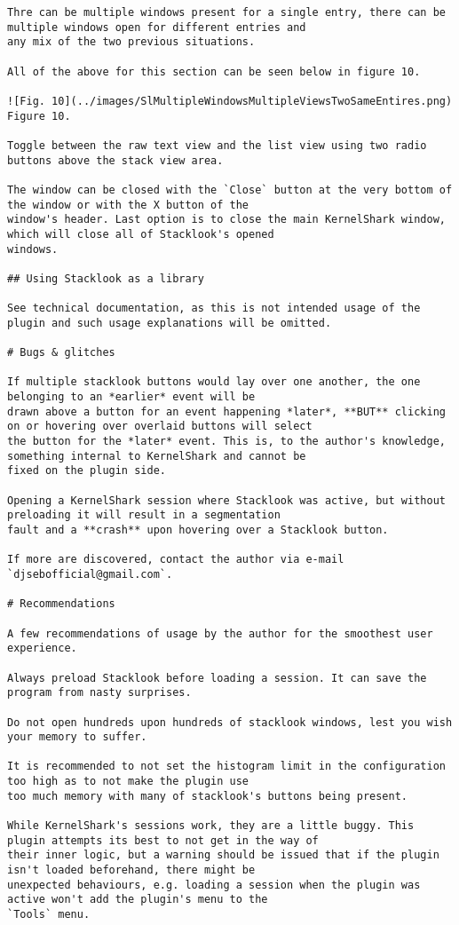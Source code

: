 \begin{verbatim}
Thre can be multiple windows present for a single entry, there can be multiple windows open for different entries and
any mix of the two previous situations.

All of the above for this section can be seen below in figure 10.

![Fig. 10](../images/SlMultipleWindowsMultipleViewsTwoSameEntires.png)
Figure 10.

Toggle between the raw text view and the list view using two radio buttons above the stack view area.

The window can be closed with the `Close` button at the very bottom of the window or with the X button of the 
window's header. Last option is to close the main KernelShark window, which will close all of Stacklook's opened 
windows.

## Using Stacklook as a library

See technical documentation, as this is not intended usage of the plugin and such usage explanations will be omitted.

# Bugs & glitches

If multiple stacklook buttons would lay over one another, the one belonging to an *earlier* event will be 
drawn above a button for an event happening *later*, **BUT** clicking on or hovering over overlaid buttons will select 
the button for the *later* event. This is, to the author's knowledge, something internal to KernelShark and cannot be
fixed on the plugin side.

Opening a KernelShark session where Stacklook was active, but without preloading it will result in a segmentation
fault and a **crash** upon hovering over a Stacklook button.

If more are discovered, contact the author via e-mail `djsebofficial@gmail.com`.

# Recommendations

A few recommendations of usage by the author for the smoothest user experience.

Always preload Stacklook before loading a session. It can save the program from nasty surprises.

Do not open hundreds upon hundreds of stacklook windows, lest you wish your memory to suffer.

It is recommended to not set the histogram limit in the configuration too high as to not make the plugin use
too much memory with many of stacklook's buttons being present.

While KernelShark's sessions work, they are a little buggy. This plugin attempts its best to not get in the way of
their inner logic, but a warning should be issued that if the plugin isn't loaded beforehand, there might be
unexpected behaviours, e.g. loading a session when the plugin was active won't add the plugin's menu to the
`Tools` menu.
\end{verbatim}
